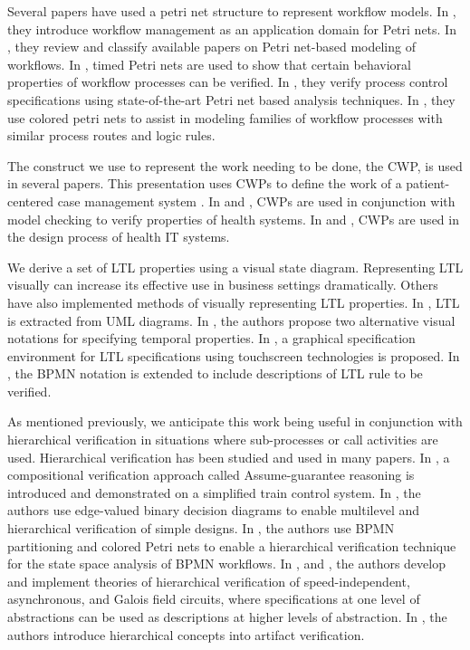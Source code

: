 Several papers have used a petri net structure to represent workflow models. In \cite{petriNet1}, they introduce workflow management as an application domain for Petri nets. In \cite{petriNet2}, they review and classify available papers on Petri net-based modeling of workflows. In \cite{petriNet3}, timed Petri nets are used to show that certain behavioral properties of workflow processes can be verified. In \cite{petriNet4}, they verify process control specifications using state-of-the-art Petri net based analysis techniques. In \cite{petriNet5}, they use colored petri nets to assist in modeling families of workflow processes with similar process routes and logic rules.

The construct we use to represent the work needing to be done, the CWP, is used in several papers. This presentation uses CWPs to define the work of a patient-centered case management system \cite{CWPRW1}. In \cite{CWPRW2} and \cite{CWPRW3}, CWPs are used in conjunction with model checking to verify properties of health systems. In \cite{CWPRW4} and \cite{CWPRW5}, CWPs are used in the design process of health IT systems.

We derive a set of LTL properties using a visual state diagram. Representing LTL visually can increase its effective use in business settings dramatically. Others have also implemented methods of visually representing LTL properties. In \cite{LTLVisualization1}, LTL is extracted from UML diagrams. In \cite{LTLVisualization2}, the authors propose two alternative visual notations for specifying temporal properties. In \cite{LTLVisualization3}, a graphical specification environment for LTL specifications using touchscreen technologies is proposed. In \cite{LTLVisualization4}, the BPMN notation is extended to include descriptions of LTL rule to be verified.

As mentioned previously, we anticipate this work being useful in conjunction with hierarchical verification in situations where sub-processes or call activities are used. Hierarchical verification has been studied and used in many papers. In \cite{hierarchicalVerification1}, a compositional verification approach called Assume-guarantee reasoning is introduced and demonstrated on a simplified train control system. In \cite{hierarchicalVerification2}, the authors use edge-valued binary decision diagrams to enable multilevel and hierarchical verification of simple designs. In \cite{hierarchicalVerification3}, the authors use BPMN partitioning and colored Petri nets to enable a hierarchical verification technique for the state space analysis of BPMN workflows. In \cite{hierarchicalVerification4}, \cite{hierarchicalVerification6} and \cite{hierarchicalVerification7}, the authors develop and implement theories of hierarchical verification of speed-independent, asynchronous, and Galois field circuits, where specifications at one level of abstractions can be used as descriptions at higher levels of abstraction. In \cite{hierarchicalVerification5}, the authors introduce hierarchical concepts into artifact verification.
